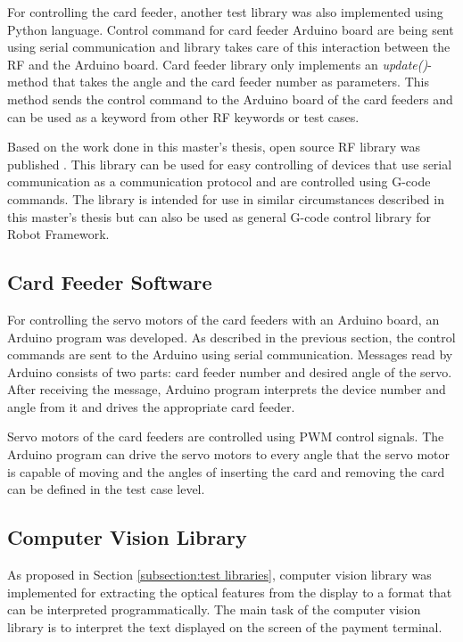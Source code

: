 For controlling the card feeder, another test library was also implemented using Python language. Control command for card feeder Arduino board are being sent using serial communication and library takes care of this interaction between the RF and the Arduino board. Card feeder library only implements an \emph{update()}-method that takes the angle and the card feeder number as parameters. This method sends the control command to the Arduino board of the card feeders and can be used as a keyword from other RF keywords or test cases.

Based on the work done in this master's thesis, open source RF library was published \citep{cnc-library}. This library can be used for easy controlling of devices that use serial communication as a communication protocol and are controlled using G-code commands. The library is intended for use in similar circumstances described in this master's thesis but can also be used as general G-code control library for Robot Framework.

\subsection{Card Feeder Software}
\label{subsection:card feeder software}

For controlling the servo motors of the card feeders with an Arduino board, an Arduino program was developed. As described in the previous section, the control commands are sent to the Arduino using serial communication. Messages read by Arduino consists of two parts: card feeder number and desired angle of the servo. After receiving the message, Arduino program interprets the device number and angle from it and drives the appropriate card feeder. 

Servo motors of the card feeders are controlled using PWM control signals. The Arduino program can drive the servo motors to every angle that the servo motor is capable of moving and the angles of inserting the card and removing the card can be defined in the test case level.

\subsection{Computer Vision Library}
\label{subsection:Computer vision library}

As proposed in Section \ref{subsection:test libraries}, computer vision library was implemented for extracting the optical features from the display to a format that can be interpreted programmatically. The main task of the computer vision library is to interpret the text displayed on the screen of the payment terminal.

